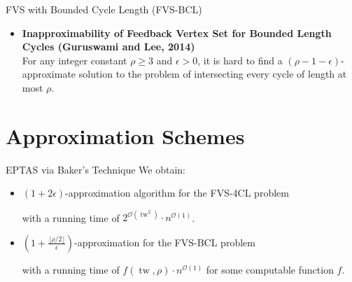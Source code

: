 \documentclass{beamer}
\newcommand{\tw}{\operatorname{tw}}
\begin{document}
\begin{frame}{FVS with Bounded Cycle Length (FVS-BCL)}
  \begin{itemize}
    \item \textbf{Inapproximability of Feedback Vertex Set for Bounded Length Cycles 
    (Guruswami and Lee, 2014)}\\
    \small For any integer constant $\rho \geq 3$ and $\epsilon > 0$, it is
    hard to find a $(\rho-1-\epsilon)$-approximate solution to the problem of intersecting every cycle
    of length at most $\rho$. 
  \end{itemize}
\end{frame}

\section{Approximation Schemes}

\begin{frame}{EPTAS via Baker's Technique}
  We obtain:
  \begin{itemize}
    \item $(1 + 2\epsilon)$-approximation algorithm for the FVS-4CL problem
    
    with a running time of $2^{\mathcal{O}(\tw^2)} \cdot n^{\mathcal{O}(1)}$.
    \item \(\left(1 + \frac{\lfloor\rho/2\rfloor}{\epsilon}\right)\)-approximation for the FVS-BCL problem 
    
    with a running time of \( f\left(\tw, \rho\right) \cdot n^{\mathcal{O}\left(1\right)} \) 
    for some computable function $f$.
  \end{itemize}
\end{frame}
\end{document}
